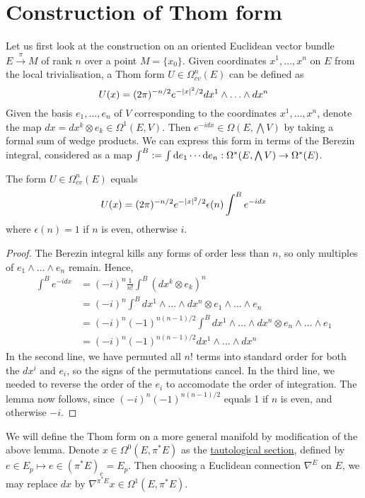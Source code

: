 \section{Construction of Thom form}
Let us first look at the construction on an oriented Euclidean vector bundle
$E\xrightarrow{\pi} M$ of rank $n$ over a point $M=\{x_0\}$. 
Given coordinates $x^1,\ldots,x^n$ on $E$ from the local trivialisation,
a Thom form $U\in \Omega^n_{cv}(E)$ can be defined as
\[
	U(x) = (2\pi)^{-n/2}e^{-\abs{x}^2 /2} dx^1\wedge \ldots\wedge dx^n
\] 
Given the basis $e_1,\ldots,e_n$ of  $V$ corresponding to the coordinates
$x^1,\ldots,x^n$, denote the map $dx = dx^k \otimes e_k \in 
\Omega^1(E, V)$. Then $e^{-idx}\in \Omega(E,\bigwedge V)$ by taking a formal sum
of wedge products.
We can express this form in terms of the Berezin integral,
considered as a map $\int^B := \int \odif{e_1}\cdots\odif{e_n} 
: \Omega^*(E,\bigwedge V) \to \Omega^*(E)$.

\begin{lem} \label{lem:gaussian_integral} %
	The form $U\in \Omega^n_{cv}(E)$ equals 
	\[
		 U(x) = (2\pi)^{-n/2} e^{-\abs{x}^2 /2} \epsilon(n)\int^B e^{-idx}
	\] 
	where $\epsilon(n)=1$ if  $n$ is even, otherwise  $i$.
\end{lem}
\begin{proof}
	The Berezin integral kills any forms of order less than $n$, so only
	multiples of $e_1 \wedge \ldots\wedge e_n$ remain.
	Hence,
	\begin{align*}
		\int^B e^{-idx} 
		&= (-i)^n \frac{1}{n!}\int^B (dx^k\otimes e_k)^n \\
		&= (-i)^n \int^B dx^1\wedge \ldots\wedge dx^n\otimes e_1 \wedge\ldots\wedge e_n \\
		&= (-i)^n(-1)^{n(n-1)/2} \int^B dx^1\wedge \ldots\wedge dx^n\otimes e_n \wedge\ldots\wedge e_1 \\
		&= (-i)^n(-1)^{n(n-1)/2} dx^1\wedge \ldots\wedge dx^n
	\end{align*}
	In the second line, we have permuted all $n!$ terms into standard order for
	both the $dx^i$ and  $e_i$, so the signs of the permutations cancel.
	In the third line, we needed to reverse the order of the $e_i$ to accomodate
	the order of integration. The lemma now follows, since
	$(-i)^n(-1)^{n(n-1)/2}$ equals 1 if $n$ is even, and otherwise  $-i$. 
\end{proof}
We will define the Thom form on a more general manifold by modification of the
above lemma. Denote $x \in \Omega^0(E,\pi^*E)$ as the \underline{tautological
section}, defined by $e\in E_p \mapsto e\in (\pi^*E)_{e} = E_{p}$.
Then choosing a Euclidean connection $\nabla^E$ on  $E$, we may replace  $dx$ by 
$\nabla^{\pi^*E} x \in \Omega^1(E,\pi^*E)$.

